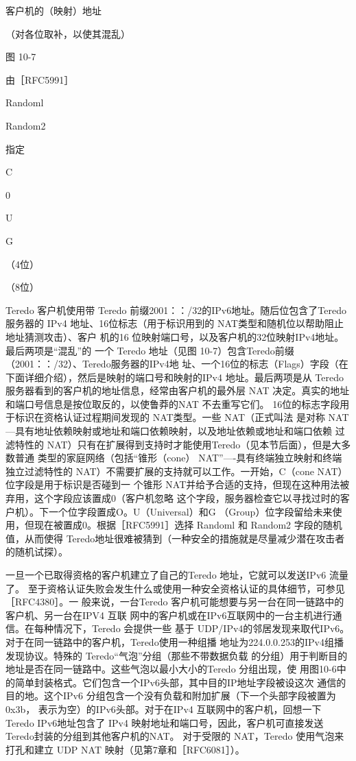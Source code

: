 客户机的（映射）地址

（对各位取补，以使其混乱）

图 10-7

由［RFC5991］

Randoml

Random2

指定

C

0

U

G

（4位）

（8位）

Teredo 客户机使用带 Teredo 前缀2001：：/32的IPv6地址。随后位包含了Teredo服务器的
IPv4 地址、16位标志（用于标识用到的 NAT类型和随机位以帮助阻止地址猜测攻击）、客户
机的16 位映射端口号，以及客户机的32位映射IPv4地址。最后两项是“混乱”的
一个 Teredo 地址（见图 10-7）包含Teredo前缀（2001：：/32）、Teredo服务器的IPv4地
址、一个16位的标志（Flags）字段（在下面详细介绍），然后是映射的端口号和映射的IPv4
地址。最后两项是从 Teredo服务器看到的客户机的地址信息，经常由客户机的最外层 NAT
决定。真实的地址和端口号信息是按位取反的，以使鲁莽的NAT 不去重写它们。
16位的标志字段用于标识在资格认证过程期间发现的 NAT类型。一些 NAT（正式叫法
是对称 NAT—具有地址依赖映射或地址和端口依赖映射，以及地址依赖或地址和端口依赖
过滤特性的 NAT）只有在扩展得到支持时才能使用Teredo（见本节后面），但是大多数普通
类型的家庭网络（包括“锥形（cone） NAT”—-具有终端独立映射和终端独立过滤特性的
NAT）不需要扩展的支持就可以工作。一开始，C（cone NAT）位字段是用于标识是否碰到一
个锥形 NAT并给予合适的支持，但现在这种用法被弃用，这个字段应该置成0（客户机忽略
这个字段，服务器检查它以寻找过时的客户机）。下一个位字段置成O。U（Universal）和G
（Group）位字段留给未来使用，但现在被置成0。根据［RFC5991］选择 Randoml 和 Random2
字段的随机值，从而使得 Teredo地址很难被猜到（一种安全的措施就是尽量减少潜在攻击者
的随机试探）。

一旦一个已取得资格的客户机建立了自己的Teredo 地址，它就可以发送IPv6 流量了。
至于资格认证失败会发生什么或使用一种安全资格认证的具体细节，可参见［RFC4380］。一
般来说，一台Teredo 客户机可能想要与另一台在同一链路中的客户机、另一台在IPV4 互联
网中的客户机或在IPv6互联网中的一台主机进行通信。在每种情况下，Teredo 会提供一些
基于 UDP/IPv4的邻居发现来取代IPv6。对于在同一链路中的客户机，Teredo使用一种组播
地址为224.0.0.253的IPv4组播发现协议。特殊的 Teredo“气泡”分组（那些不带数据负载
的分组）用于判断目的地址是否在同一链路中。这些气泡以最小大小的Teredo 分组出现，使
用图10-6中的简单封装格式。它们包含一个IPv6头部，其中目的IP地址字段被设这次
通信的目的地。这个IPv6 分组包含一个没有负载和附加扩展（下一个头部字段被置为0x3b，
表示为空）的IPv6头部。对于在IPv4 互联网中的客户机，回想一下 Teredo IPv6地址包含了
IPv4 映射地址和端口号，因此，客户机可直接发送Teredo封装的分组到其他客户机的NAT。
对于受限的 NAT，Teredo 使用气泡来打孔和建立 UDP NAT 映射（见第7章和［RFC6081］）。

